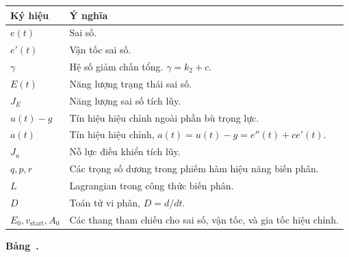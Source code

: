 ﻿\documentclass[12pt]{article}
\begin{document}
\begin{center}
\label{tab:energy-notation}
\centering
\begin{tabular}{|>{\centering\arraybackslash}p{2.4cm}|>{\raggedright\arraybackslash}p{11.2cm}|}
\hline
\textbf{Ký hiệu} & \textbf{Ý nghĩa} \\
\hline
$e(t)$ & Sai số.  \\
\hline
$e'(t)$ & Vận tốc sai số. \\
\hline
$\gamma$ & Hệ số giảm chấn tổng. $\gamma = k_2 + c$. \\
\hline
$E(t)$ & Năng lượng trạng thái sai số. \\
\hline
$J_E$ & Năng lượng sai số tích lũy. \\
\hline
$u(t) - g$ & Tín hiệu hiệu chỉnh ngoài phần bù trọng lực. \\
\hline
$a(t)$ & Tín hiệu hiệu chỉnh, $a(t) = u(t) - g = e''(t) + ce'(t)$. \\
\hline
$J_u$ & Nỗ lực điều khiển tích lũy. \\
\hline
$q, p, r$ & Các trọng số dương trong phiếm hàm hiệu năng biến phân. \\
\hline
$L$ & Lagrangian trong công thức biến phân. \\
\hline
$D$ & Toán tử vi phân, $D = d/dt$. \\
\hline
$E_0, v_{\mathrm{start}}, A_0$ & Các thang tham chiếu cho sai số, vận tốc, và gia tốc hiệu chỉnh. \\
\hline
\end{tabular}
\par\smallskip
\textbf{Bảng~\thetable.} 
\end{center}
\end{document}
